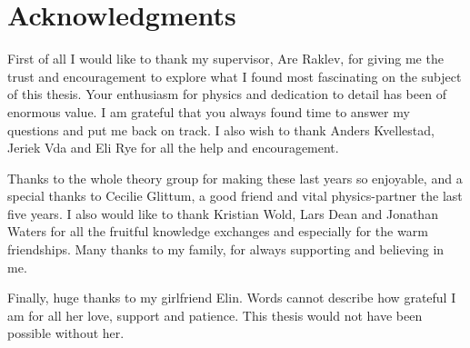\chapter*{Acknowledgments}
First of all I would like to thank my supervisor, Are Raklev, for giving me the trust and encouragement to explore what I found most fascinating on the subject of this thesis. Your enthusiasm for physics and dedication to detail has been of enormous value. I am grateful that you always found time to answer my questions and put me back on track.  I also wish to thank Anders Kvellestad, Jeriek Vda and Eli Rye for all the help and encouragement. 

Thanks to the whole theory group for making these last years so enjoyable, and a special thanks to Cecilie Glittum, a good friend and vital physics-partner the last five years. I also would like to thank Kristian Wold, Lars Dean and Jonathan Waters for all the fruitful knowledge exchanges and especially for the warm friendships. Many thanks to my family, for always supporting and believing in me. 

Finally, huge thanks to my girlfriend Elin. Words cannot describe how grateful I am for all her love, support and patience. This thesis would not have been possible without her. 